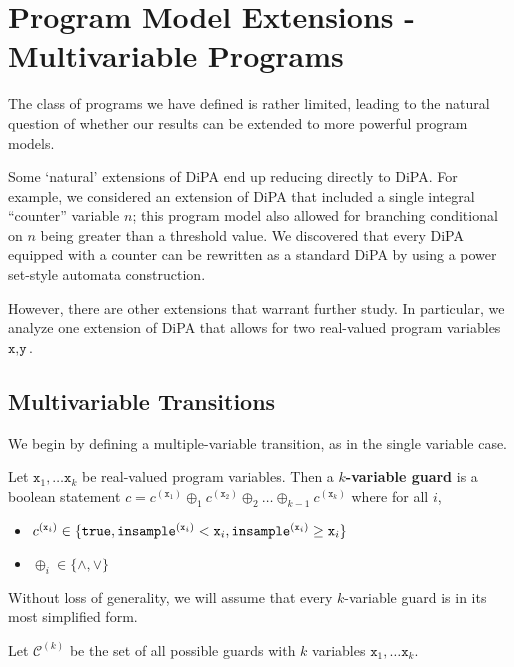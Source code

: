 
\section{Program Model Extensions - Multivariable Programs}

The class of programs we have defined is rather limited, leading to the natural question of whether our results can be extended to more powerful program models. 

Some `natural' extensions of DiPA end up reducing directly to DiPA. For example, we considered an extension of DiPA that included a single integral ``counter'' variable $n$; this program model also allowed for branching conditional on $n$ being greater than a threshold value. 
We discovered that every DiPA equipped with a counter can be rewritten as a standard DiPA by using a power set-style automata construction. 

However, there are other extensions that warrant further study. In particular, we analyze one extension of DiPA that allows for two real-valued program variables $\texttt{x}, \texttt{y}$.

\subsection{Multivariable Transitions}

We begin by defining a multiple-variable transition, as in the single variable case. 

\begin{defn}
    Let $\texttt{x}_1, \ldots \texttt{x}_k$ be real-valued program variables. Then a \textbf{$k$-variable guard} is a boolean statement $c = c^{(\texttt{x}_1)}\oplus_1 c^{(\texttt{x}_2)}\oplus_2\ldots\oplus_{k-1}c^{(\texttt{x}_k)}$ where for all $i$, \begin{itemize}
        \item $c^{(\texttt{x}_i)}\in \{\texttt{true}, \mvlguard[\texttt{x}_i], \mvgguard[\texttt{x}_i]\}$
        \item $\oplus_i \in \{\land, \lor\}$
    \end{itemize}
    Without loss of generality, we will assume that every $k$-variable guard is in its most simplified form. 
    
    

    Let $\mathcal{C}^{(k)}$ be the set of all possible guards with $k$ variables $\texttt{x}_1, \ldots \texttt{x}_k$.
\end{defn}


